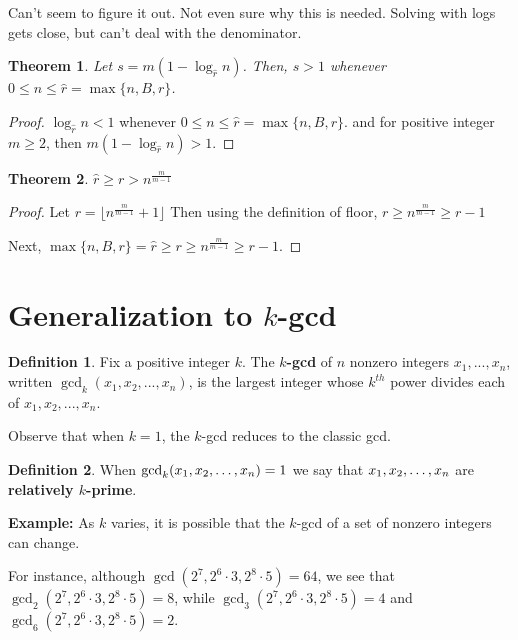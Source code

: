 \documentclass[10pt,a4paper]{article}
\newtheorem{theorem}{Theorem}[section]
\theoremstyle{definition}
\newtheorem{definition}{Definition}[section]
\theoremstyle{remark}
\begin{document}
	Can't seem to figure it out.
	Not even sure why this is needed.
	Solving with logs gets close, but can't deal with the denominator.

	\begin{theorem}
		Let \(s=m(1-\log_{\hat{r}}n)\). Then, \(s>1\) whenever \(0\leq n\leq\hat{r}=\max\{n,B,r\}\). 
	\end{theorem}
	\begin{proof}
		\(\log_{\hat{r}}n<1\) whenever \(0\leq n\leq\hat{r}=\max\{n,B,r\}\).
		and for positive integer \(m\geq 2\),
		then \(m(1-\log_{\hat{r}}n)>1\). 
	\end{proof}

	\begin{theorem}
		$\hat{r}\geq r > n^{{\frac{m}{m-1}}}$
	\end{theorem}
	\begin{proof}
		Let $r=\lfloor n^{\frac{m}{m-1}}+1\rfloor$
		Then using the definition of floor, $r\geq n^{\frac{m}{m-1}}\geq r-1$
		
		Next, $\max\{n,B,r\} = \hat{r} \geq r \geq n^{\frac{m}{m-1}}\geq r-1$. 
	\end{proof}


\section{Generalization to  \texorpdfstring{\(k\)}{}-gcd}


\begin{definition} Fix a positive integer $k$. The \textbf{$k$-gcd} of $n$ nonzero integers $x_1, ..., x_n$, written $\gcd_k(x_1,x_2, ...,x_n)$, is the largest integer whose $k^{th}$ power divides each of $x_1, x_2, ..., x_n$.
\end{definition}	

\noindent Observe that when $k=1$, the $k$-gcd reduces to the classic gcd.

\begin{definition} When $\gcd_k(x_1,x_2,\mathellipsis,x_n)=1$ we say that  $x_1,x_2,\mathellipsis,x_n$ are \textbf{relatively $k$-prime}.
\end{definition}

\noindent \textbf{Example:}
As $k$ varies, it is possible that the $k$-gcd of a set of nonzero integers can change. 

\noindent For instance, although $\gcd(2^7, 2^6 \cdot 3, 2^8 \cdot 5) = 64$, we see that $\gcd_2(2^7, 2^6 \cdot 3, 2^8 \cdot 5)=8$, while $\gcd_3(2^7, 2^6 \cdot 3, 2^8 \cdot 5)=4$ and $\gcd_6(2^7, 2^6 \cdot 3, 2^8 \cdot 5) = 2$. 
\end{document}
